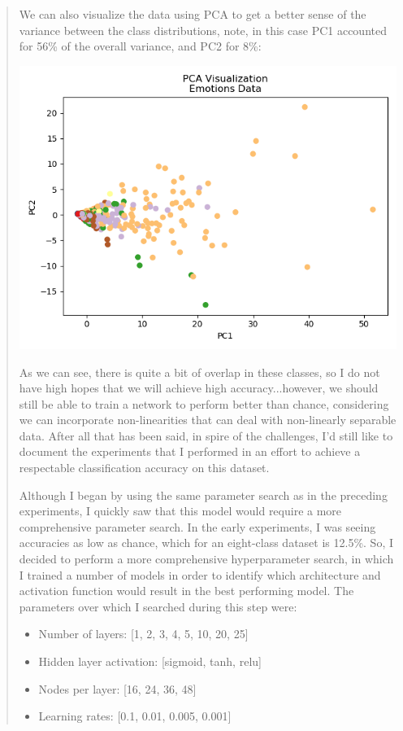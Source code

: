 \documentclass{article}
\begin{document}
\begin{quote}
	We can also visualize the data using PCA to get a better sense of the variance between the class distributions, note, in this case PC1 accounted for 56\% of the overall variance, and PC2 for 8\%:
		 		\begin{center}
		\includegraphics[scale=0.3]{figs/PCA_emotions.png}
	\end{center}
	
	As we can see, there is quite a bit of overlap in these classes, so I do not have high hopes that we will achieve high accuracy...however, we should still be able to train a network to perform better than chance, considering we can incorporate non-linearities that can deal with non-linearly separable data. After all that has been said, in spire of the challenges, I'd still like to document the experiments that I performed in an effort to achieve a respectable classification accuracy on this dataset.
	
	Although I began by using the same parameter search as in the preceding experiments, I quickly saw that this model would require a more comprehensive parameter search. In the early experiments, I was seeing accuracies as low as chance, which for an eight-class dataset is 12.5\%. So, I decided to perform a more comprehensive hyperparameter search, in which I trained a number of models in order to identify which architecture and activation function would result in the best performing model. The parameters over which I searched during this step were:
	
	\begin{itemize}
		\item [] Number of layers: [1, 2, 3, 4, 5, 10, 20, 25]
		\item [] Hidden layer activation: [sigmoid, tanh, relu]
		\item [] Nodes per layer: [16, 24, 36, 48]
		\item [] Learning rates: [0.1, 0.01, 0.005, 0.001]
	\end{itemize}


\end{quote}
\end{document}
